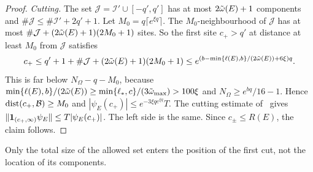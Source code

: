 \begin{proof}
\emph{Cutting.} The set $\mathcal J=\mathcal I'\cup[-q',q']$ has at most $2\tilde\omega(E)+1$ components and $\#\mathcal J\le\#\mathcal I'+2q'+1$. Let $M_0=q\lceil e^{\xi q}\rceil$. The $M_0$-neighbourhood of $\mathcal J$ has at most $\#\mathcal J+(2\tilde\omega(E)+1)(2M_0+1)$ sites. So the first site $c_+>q'$ at distance at least $M_0$ from $\mathcal J$ satisfies
\[
c_+\le q'+1+\#\mathcal J+(2\tilde\omega(E)+1)(2M_0+1)\le e^{(b-\min\{\ell(E),b\}/(2\tilde\omega(E))+6\xi)q}.
\]
This is far below $N_\Omega-q-M_0$, because $\min\{\ell(E),b\}/(2\tilde\omega(E))\ge\min\{\ell_*,c\}/(3\tilde\omega_{\max})>100\xi$ and $N_\Omega\ge e^{bq}/16-1$. Hence $\operatorname{dist}(c_+,\mathcal B)\ge M_0$ and $|\psi_E(c_+)|\le e^{-3\xi qe^{\xi q}}T$. The cutting estimate of~\cite[proof of Theorem~5.15]{DMuniv} gives $\|\mathbf 1_{(c_+,\infty)}\psi_E\|\le T|\psi_E(c_+)|$. The left side is the same. Since $c_\pm\le R(E)$, the claim follows.
\end{proof}

Only the total size of the allowed set enters the position of the first cut, not the location of its components.
